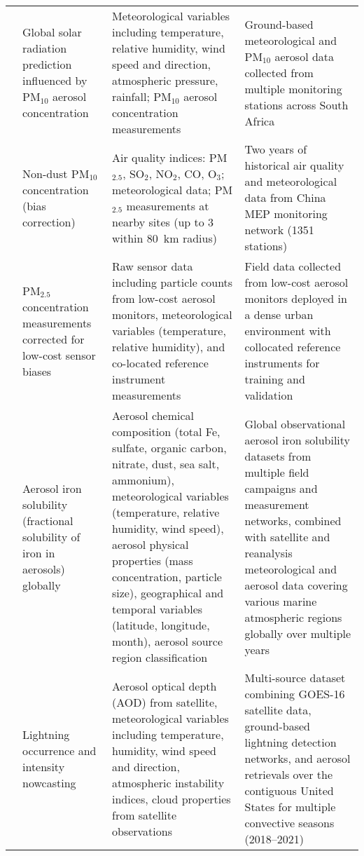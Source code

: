 \documentclass[11pt]{article}
\begin{document}
\begin{landscape}
\begin{longtable}{>{\raggedright\arraybackslash}p{2cm} 
        >{\raggedright\arraybackslash}p{4cm} 
        >{\raggedright\arraybackslash}p{10cm} 
        >{\raggedright\arraybackslash}p{6cm}}
\citet{govindasamy2021machine} & Global solar radiation prediction influenced by PM$_{10}$ aerosol concentration & Meteorological variables including temperature, relative humidity, wind speed and direction, atmospheric pressure, rainfall; PM$_{10}$ aerosol concentration measurements & Ground-based meteorological and PM$_{10}$ aerosol data collected from multiple monitoring stations across South Africa \\[6pt]

\citet{jin2019machine} & Non-dust PM$_{10}$ concentration (bias correction) & Air quality indices: PM$_{2.5}$, SO$_2$, NO$_2$, CO, O$_3$; meteorological data; PM$_{2.5}$ measurements at nearby sites (up to 3 within 80~km radius) & Two years of historical air quality and meteorological data from China MEP monitoring network (1351 stations) \\

\citet{johnson2018using} & PM$_{2.5}$ concentration measurements corrected for low-cost sensor biases & Raw sensor data including particle counts from low-cost aerosol monitors, meteorological variables (temperature, relative humidity), and co-located reference instrument measurements & Field data collected from low-cost aerosol monitors deployed in a dense urban environment with collocated reference instruments for training and validation \\[6pt]

\citet{shi2022aerosol} & Aerosol iron solubility (fractional solubility of iron in aerosols) globally & Aerosol chemical composition (total Fe, sulfate, organic carbon, nitrate, dust, sea salt, ammonium), meteorological variables (temperature, relative humidity, wind speed), aerosol physical properties (mass concentration, particle size), geographical and temporal variables (latitude, longitude, month), aerosol source region classification & Global observational aerosol iron solubility datasets from multiple field campaigns and measurement networks, combined with satellite and reanalysis meteorological and aerosol data covering various marine atmospheric regions globally over multiple years \\[6pt]

\citet{song2023lightning} & Lightning occurrence and intensity nowcasting & Aerosol optical depth (AOD) from satellite, meteorological variables including temperature, humidity, wind speed and direction, atmospheric instability indices, cloud properties from satellite observations & Multi-source dataset combining GOES-16 satellite data, ground-based lightning detection networks, and aerosol retrievals over the contiguous United States for multiple convective seasons (2018–2021) \\[6pt]

\hline
\end{longtable}
\end{landscape}
\end{document}
